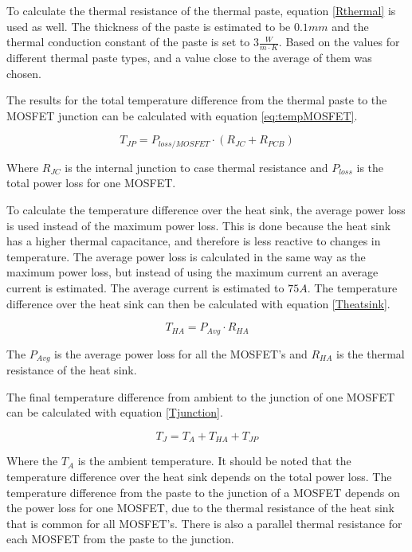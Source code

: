 To calculate the thermal resistance of the thermal paste, equation \ref{Rthermal} is used as well. The thickness of the paste is estimated to be $0.1 mm$ and the thermal conduction constant of the paste is set to $3 \frac{W}{m \cdot K}$. Based on the values for different thermal paste types, and a value close to the average of them was chosen.

The results for the total temperature difference from the thermal paste to the MOSFET junction can be calculated with equation \ref{eq:tempMOSFET}.

    \begin{equation}
        T_{JP} = P_{loss/MOSFET} \cdot (R_{JC} + R_{PCB})
        \label{eq:tempMOSFET}
    \end{equation}
    
Where $R_{JC}$ is the internal junction to case thermal resistance and $P_{loss}$ is the total power loss for one MOSFET. 

To calculate the temperature difference over the heat sink, the average power loss is used instead of the maximum power loss. This is done because the heat sink has a higher thermal capacitance, and therefore is less reactive to changes in temperature. The average power loss is calculated in the same way as the maximum power loss, but instead of using the maximum current an average current is estimated. The average current is estimated to $75 A$.
The temperature difference over the heat sink can then be calculated with equation \ref{Theatsink}.

    \begin{equation}
        T_{HA} = P_{Avg} \cdot R_{HA}
        \label{Theatsink}
    \end{equation}

The $P_{Avg}$ is the average power loss for all the MOSFET's and $R_{HA}$ is the thermal resistance of the heat sink. 

The final temperature difference from ambient to the junction of one MOSFET can be calculated with equation \ref{Tjunction}.

    \begin{equation}
        T_{J} = T_A + T_{HA} + T_{JP}
        \label{Tjunction}
    \end{equation}
    
Where the $T_A$ is the ambient temperature. 
It should be noted that the temperature difference over the heat sink depends on the total power loss. 
The temperature difference from the paste to the junction of a MOSFET depends on the power loss for one MOSFET, due to the thermal resistance of the heat sink that is common for all MOSFET's.
There is also a parallel thermal resistance for each MOSFET from the paste to the junction.

